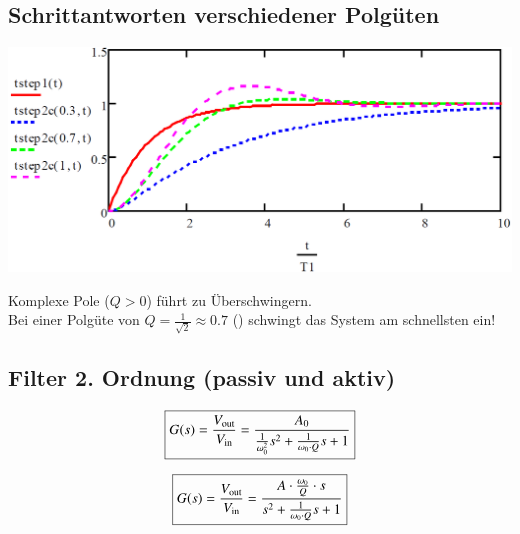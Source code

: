 \subsection{Schrittantworten verschiedener Polgüten}

\begin{minipage}[c]{0.48\columnwidth}
    \includegraphics[width=\columnwidth]{images/schrittantwort_verschiedene_polgueten.png}
\end{minipage}
\hfill
\begin{minipage}[c]{0.48\columnwidth}
    Komplexe Pole ($Q > 0$) führt zu Überschwingern. \\
    Bei einer Polgüte von $Q = \frac{1}{\sqrt{2}} \approx 0.7$ () schwingt das System am schnellsten ein!
\end{minipage}


\subsection{Filter 2. Ordnung (passiv und aktiv)}

\begin{minipage}[c]{0.48\columnwidth}
    \begin{center}
    \end{center}
    $$ \boxed{ G(s) = \frac{V_{\rm out}}{V_{\rm in}} = \frac{A_0}{\frac{1}{\omega_0^2} s^2 + \frac{1}{\omega_0 \cdot Q} s + 1 } } $$
\end{minipage}
\hfill
\begin{minipage}[c]{0.48\columnwidth}
    \begin{center}
    \end{center}
    $$ \boxed{ G(s) = \frac{V_{\rm out}}{V_{\rm in}} = \frac{A \cdot \frac{\omega_0}{Q} \cdot s}{s^2 +  \frac{1}{ \omega_0 \cdot Q} s + 1 } } $$
\end{minipage}

